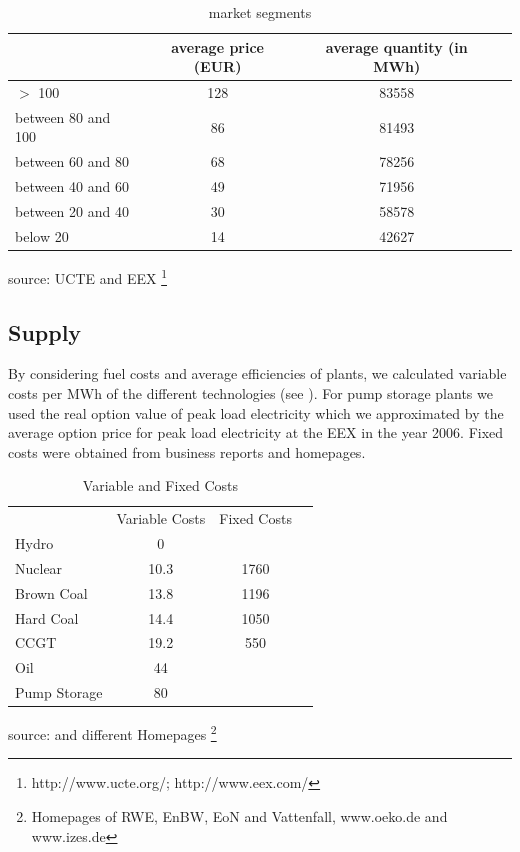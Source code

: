 \begin{table}
\begin{tabular}{llll}
 & \multicolumn{1}{c}{average price (EUR)} & \multicolumn{1}{c}{average quantity (in MWh)} &  \\ 
 \hline
$>$ 100 & \multicolumn{1}{c}{128} & \multicolumn{1}{c}{83558} &  \\ 
between 80 and 100 & \multicolumn{1}{c}{86} & \multicolumn{1}{c}{81493} &  \\ 
between 60 and 80 & \multicolumn{1}{c}{68} & \multicolumn{1}{c}{78256} &  \\ 
between 40 and 60 & \multicolumn{1}{c}{49} & \multicolumn{1}{c}{71956} &  \\ 
between 20 and 40 & \multicolumn{1}{c}{30} & \multicolumn{1}{c}{58578} &  \\ 
below 20 & \multicolumn{1}{c}{14} & \multicolumn{1}{c}{42627} &  \\ 
\hline
\end{tabular}
\label{tab:demand}
\caption{market segments}
\begin{center}
source: UCTE and EEX \footnote{http://www.ucte.org/; http://www.eex.com/}
\end{center}    
\end{table}

\subsection{Supply}

By considering fuel costs and average efficiencies of plants, we calculated variable costs per MWh of the different technologies (see \cite{Leprich2004}). For pump storage plants we used the real option value of peak load electricity which we approximated by the average option price for peak load electricity at the EEX in the year 2006. Fixed costs were obtained from business reports and homepages.

\begin{table}
\begin{tabular}{llll}
 & Variable Costs & Fixed Costs &  \\ 
Hydro & \multicolumn{1}{c}{0} & \multicolumn{1}{c}{} &  \\ 
Nuclear & \multicolumn{1}{c}{10.3} & \multicolumn{1}{c}{1760} &  \\ 
Brown Coal & \multicolumn{1}{c}{13.8} & \multicolumn{1}{c}{1196} &  \\ 
Hard Coal & \multicolumn{1}{c}{14.4} & \multicolumn{1}{c}{1050} &  \\ 
CCGT & \multicolumn{1}{c}{19.2} & \multicolumn{1}{c}{550} &  \\ 
Oil & \multicolumn{1}{c}{44} & \multicolumn{1}{c}{} &  \\ 
Pump Storage & \multicolumn{1}{c}{80} &  &  \\ 
\end{tabular}\label{tab:costs}
\caption{Variable and Fixed Costs}
\begin{center}
source: \cite{Leprich2004} and different Homepages  \footnote{Homepages of RWE, EnBW, EoN and Vattenfall, www.oeko.de and www.izes.de}
\end{center}
\end{table}

